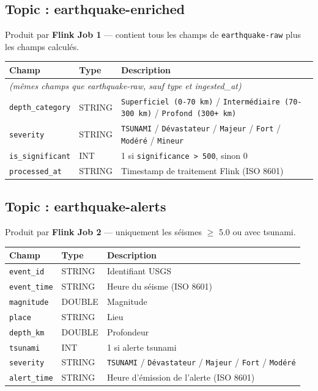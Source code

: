 \documentclass[12pt,a4paper]{article}
\begin{document}
\subsection{Topic : earthquake-enriched}

Produit par \textbf{Flink Job 1} --- contient tous les champs de \texttt{earthquake-raw}
plus les champs calculés.

\begin{center}
\begin{tabularx}{\textwidth}{llX}
  \toprule
  \textbf{Champ} & \textbf{Type} & \textbf{Description} \\
  \midrule
  \multicolumn{3}{l}{\textit{(mêmes champs que earthquake-raw, sauf type et ingested\_at)}} \\
  \midrule
  \texttt{depth\_category} & STRING & \texttt{Superficiel (0-70 km)} / \texttt{Intermédiaire (70-300 km)} / \texttt{Profond (300+ km)} \\
  \texttt{severity}        & STRING & \texttt{TSUNAMI} / \texttt{Dévastateur} / \texttt{Majeur} / \texttt{Fort} / \texttt{Modéré} / \texttt{Mineur} \\
  \texttt{is\_significant} & INT    & 1 si \texttt{significance > 500}, sinon 0 \\
  \texttt{processed\_at}   & STRING & Timestamp de traitement Flink (ISO 8601) \\
  \bottomrule
\end{tabularx}
\end{center}

\subsection{Topic : earthquake-alerts}

Produit par \textbf{Flink Job 2} --- uniquement les séismes $\geq$ 5.0 ou avec tsunami.

\begin{center}
\begin{tabularx}{\textwidth}{llX}
  \toprule
  \textbf{Champ} & \textbf{Type} & \textbf{Description} \\
  \midrule
  \texttt{event\_id}   & STRING & Identifiant USGS \\
  \texttt{event\_time} & STRING & Heure du séisme (ISO 8601) \\
  \texttt{magnitude}   & DOUBLE & Magnitude \\
  \texttt{place}       & STRING & Lieu \\
  \texttt{depth\_km}   & DOUBLE & Profondeur \\
  \texttt{tsunami}     & INT    & 1 si alerte tsunami \\
  \texttt{severity}    & STRING & \texttt{TSUNAMI} / \texttt{Dévastateur} / \texttt{Majeur} / \texttt{Fort} / \texttt{Modéré} \\
  \texttt{alert\_time} & STRING & Heure d'émission de l'alerte (ISO 8601) \\
  \bottomrule
\end{tabularx}
\end{center}
\end{document}
